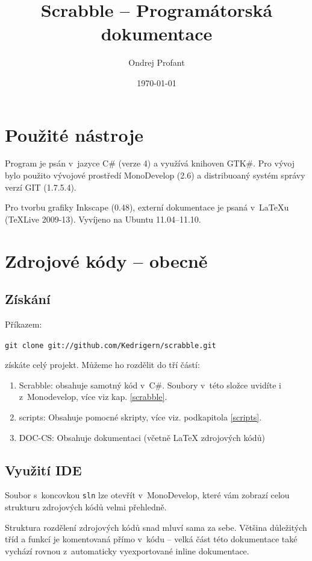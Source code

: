 \documentclass[a4paper]{article}
\title{Scrabble -- Programátorská dokumentace}
\author{Ondrej Profant}
\date{\today}
\begin{document}
\maketitle

\tableofcontents	

\newpage

\section{Použité nástroje}
Program je psán v~jazyce C\# (verze 4) a využívá knihoven GTK\#. 
Pro vývoj bylo použito vývojové prostředí MonoDevelop (2.6) a distribuoaný systém správy verzí GIT (1.7.5.4).

Pro tvorbu grafiky Inkscape (0.48), externí dokumentace je psaná v~\LaTeX{u} (TeXLive 2009-13). Vyvíjeno na Ubuntu 11.04--11.10.



\section{Zdrojové kódy -- obecně}
\subsection{Získání}
Příkazem:

\texttt{git clone git://github.com/Kedrigern/scrabble.git} 

\noindent
získáte celý projekt. Můžeme ho rozdělit do tří částí:
\begin{enumerate}
\item Scrabble: obsahuje samotný kód v~C\#. Soubory v~této složce uvidíte i z~Monodevelop, více viz kap. \ref{scrabble}.
\item scripts: Obsahuje pomocné skripty, více viz. podkapitola \ref{scripts}.
\item DOC-CS: Obsahuje dokumentaci (včetně \LaTeX{} zdrojových kódů)
\end{enumerate}

\subsection{Využití IDE}
Soubor s~koncovkou \texttt{sln} lze otevřít v~MonoDevelop, které vám zobrazí celou strukturu zdrojových kódů velmi přehledně.

Struktura rozdělení zdrojových kódů snad mluví sama za sebe. Většina důležitých tříd a funkcí je komentovaná přímo v~kódu -- velká část této dokumentace také vychází rovnou z~automaticky vyexportované inline dokumentace. 
\end{document}
